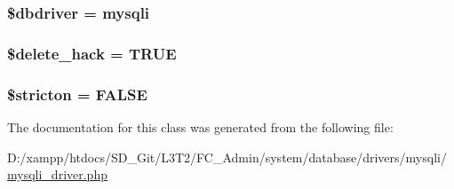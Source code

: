 \subsubsection[{\$dbdriver}]{\setlength{\rightskip}{0pt plus 5cm}\$dbdriver = \textquotesingle{}mysqli\textquotesingle{}}\label{class_c_i___d_b__mysqli__driver_a0cde2a16322a023d040aa7f725877597}
\hypertarget{class_c_i___d_b__mysqli__driver_ad60008f32a478e978c7c3284f320f273}{}
\subsubsection[{\$delete\+\_\+hack}]{\setlength{\rightskip}{0pt plus 5cm}\$delete\+\_\+hack = T\+R\+U\+E}\label{class_c_i___d_b__mysqli__driver_ad60008f32a478e978c7c3284f320f273}
\hypertarget{class_c_i___d_b__mysqli__driver_afb42d9811bec1da94506e5764e1439e0}{}
\subsubsection[{\$stricton}]{\setlength{\rightskip}{0pt plus 5cm}\$stricton = F\+A\+L\+S\+E}\label{class_c_i___d_b__mysqli__driver_afb42d9811bec1da94506e5764e1439e0}


The documentation for this class was generated from the following file\+:\begin{DoxyCompactItemize}
\item 
D\+:/xampp/htdocs/\+S\+D\+\_\+\+Git/\+L3\+T2/\+F\+C\+\_\+\+Admin/system/database/drivers/mysqli/\hyperlink{mysqli__driver_8php}{mysqli\+\_\+driver.\+php}\end{DoxyCompactItemize}
